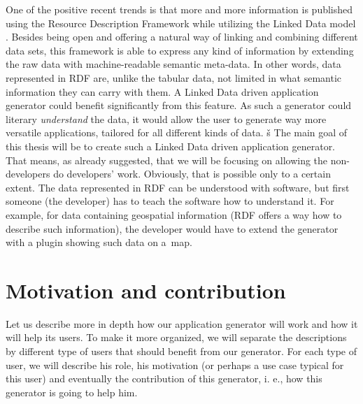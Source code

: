 One of the positive recent trends is that more and more information is published using the Resource Description Framework \cite{rdf} while utilizing the Linked Data model \cite{ld}. Besides being open and offering a natural way of linking and combining different data sets, this framework is able to express any kind of information by extending the raw data with machine-readable semantic meta-data. In other words, data represented in RDF are, unlike the tabular data, not limited in what semantic information they can carry with them. A Linked Data driven application generator could benefit significantly from this feature. As such a generator could literary \textit{understand} the data, it would allow the user to generate way more versatile applications, tailored for all different kinds of data. 
%
%
%
%
%
š
The main goal of this thesis will be to create such a Linked Data driven application generator. That means, as already suggested, that we will be focusing on allowing the non-developers do developers' work. Obviously, that is possible only to a certain extent. The data represented in RDF can be understood with software, but first someone (the developer) has to teach the software how to understand it. For example, for data containing geospatial information (RDF offers a way how to describe such information), the developer would have to extend the generator with a plugin showing such data on a~map.

\section*{Motivation and contribution}
%
%
%
Let us describe more in depth how our application generator will work and how it will help its users. To make it more organized, we will separate the descriptions by different type of users that should benefit from our generator. For each type of user, we will describe his role, his motivation (or perhaps a use case typical for this user) and eventually the contribution of this generator, i. e., how this generator is going to help him.

